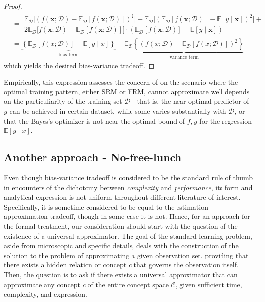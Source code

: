 \begin{proof}
\begin{equation}
\begin{split}
            & = \begin{multlined}
                \mathbb{E}_{\mathcal{D}} \Big[(f(\mathbf{x};\mathcal{D})-\mathbb{E}_{\mathcal{D}}[f(\mathbf{x};\mathcal{D})])^{2}\Big] + \mathbb{E}_{\mathcal{D}} \Big[ (\mathbb{E}_{\mathcal{D}} [f(\mathbf{x};\mathcal{D})] - \mathbb{E}[y\mid \mathbf{x}])^{2} \Big] + \\2\mathbb{E}_{\mathcal{D}}\Big[f(\mathbf{x};\mathcal{D})-\mathbb{E}_{\mathcal{D}}[f(\mathbf{x};\mathcal{D})]\Big]\cdot (\mathbb{E}_{\mathcal{D}}[f(\mathbf{x};\mathcal{D})]-\mathbb{E}[y\mid \mathbf{x}])
            \end{multlined} \\
            & = \underbrace{\left\{ \mathbb{E}_{\mathcal{D}}[f(x;\mathcal{D})] - \mathbb{E}[y\mid x] \right\}}_{\text{bias term}} + \underbrace{\mathbb{E}_{\mathcal{D}} \left\{(f(x;\mathcal{D})- \mathbb{E}_{\mathcal{D}}[f(x;\mathcal{D})])^{2}\right\}}_{\text{variance term}}
        \end{split}
    \end{equation}
    which yields the desired bias-variance tradeoff. 
\end{proof}
Empirically, this expression assesses the concern of \cite{6797087} on the scenario where the optimal training pattern, either SRM or ERM, cannot approximate well depends on the particuliarity of the training set $\mathcal{D}$ - that is, the near-optimal predictor of $y$ can be achieved in certain dataset, while some varies substantially with $\mathcal{D}$, or that the Bayes's optimizer is not near the optimal bound of $f,y$ for the regression $\mathbb{E}[y\mid x]$. 

\subsection{Another approach - No-free-lunch}

Even though bias-variance tradeoff is considered to be the standard rule of thumb in encounters of the dichotomy between \textit{complexity} and \textit{performance}, its form and analytical expression is not uniform throughout different literature of interest. Specifically, it is sometime considered to be equal to the estimation-approximation tradeoff, though in some case it is not. Hence, for an approach for the formal treatment, our consideration should start with the question of the existence of a universal approximator. The goal of the standard learning problem, aside from microscopic and specific details, deals with the construction of the solution to the problem of approximating a given observation set, providing that there exists a hidden relation or concept $c$ that governs the observation itself. Then, the question is to ask if there exists a universal approximator that can approximate any concept $c$ of the entire concept space $\mathcal{C}$, given sufficient time, complexity, and expression. 

